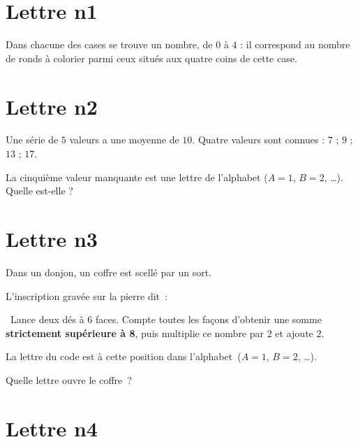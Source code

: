 

\def\Titre{... La cagnotte ?}
\def\Classe{2dne}


\vspace*{0.1cm}
\MonTitre{\ldots}
\vspace*{0.4cm}
\section{Lettre n1}


Dans chacune des cases se trouve un nombre, de $0$ à $4$ : il correspond au nombre de ronds à colorier parmi ceux situés aux quatre coins de cette case.

\vspace*{0.4cm}

\section{Lettre n2}
Une série de $5$ valeurs a une moyenne de $10$.
Quatre valeurs sont connues : $7$ ; $9$ ; $13$ ; $17$.

La cinquième valeur manquante est une lettre de l'alphabet ($A=1$, $B=2$, \ldots).  Quelle est-elle ?

\vspace*{0.4cm}

\section{Lettre n3}
Dans un donjon, un coffre est scellé par un sort.

L'inscription gravée sur la pierre dit~:

\medskip
\og~Lance deux dés à 6 faces. Compte toutes les façons d'obtenir
une somme \textbf{strictement supérieure à 8}, puis multiplie
ce nombre par $2$ et ajoute $2$.

La lettre du code est à cette position
dans l'alphabet~($A=1$, $B=2$, \ldots).~\fg

\medskip
Quelle lettre ouvre le coffre~?

\vspace*{0.4cm}

\section{Lettre n4}

